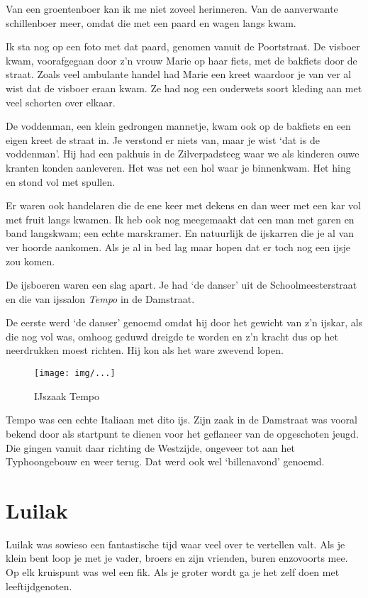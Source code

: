 \documentclass[10pt,twoside,openright]{memoir}
\begin{document}
Van een groentenboer kan ik me niet zoveel herinneren. Van de aanverwante schillenboer meer, omdat die met een paard en wagen langs kwam. 

Ik sta nog op een foto met dat paard, genomen vanuit de Poortstraat. De visboer kwam, voorafgegaan door z’n vrouw Marie op haar fiets, met de bakfiets door de straat. Zoals veel ambulante handel had Marie een kreet waardoor je van ver al wist dat de visboer eraan kwam. Ze had nog een ouderwets soort kleding aan met veel schorten over elkaar.

De voddenman, een klein gedrongen mannetje, kwam ook op de bakfiets en een eigen kreet de straat in. Je verstond er niets van, maar je wist `dat is de voddenman’. Hij had een pakhuis in de Zilverpadsteeg waar we als kinderen ouwe kranten konden aanleveren. Het was net een hol waar je binnenkwam. Het hing en stond vol met spullen. 

Er waren ook handelaren die de ene keer met dekens en dan weer met een kar vol met fruit langs kwamen. Ik heb ook nog meegemaakt dat een man met garen en band langskwam; een echte marskramer. En natuurlijk de ijskarren die je al van ver hoorde aankomen. Als je al in bed lag maar hopen dat er toch nog een ijsje zou komen.

De ijsboeren waren een slag apart. Je had `de danser’ uit de Schoolmeesterstraat en die van ijssalon \emph{Tempo} in de Damstraat. 

De eerste werd `de danser' genoemd omdat hij door het gewicht van z’n ijskar, als die nog vol was, omhoog geduwd dreigde te worden en z’n kracht dus op het neerdrukken moest richten. Hij kon als het ware zwevend lopen. 

\begin{figure}[t]
\texttt{[image: img/...]}
\caption{IJszaak Tempo}
\end{figure}

Tempo was een echte Italiaan met dito ijs. Zijn zaak in de Damstraat was vooral bekend door als startpunt te dienen voor het geflaneer van de opgeschoten jeugd.  Die gingen vanuit daar richting de Westzijde, ongeveer tot aan het Typhoongebouw en weer terug. Dat werd ook wel ‘billenavond’ genoemd. 

\chapter{Luilak} %
\label{cha:luilak}

Luilak was sowieso een fantastische tijd waar veel over te vertellen valt. Als je klein bent loop je met je vader, broers en zijn vrienden, buren enzovoorts mee. Op elk kruispunt was wel een fik. Als je groter wordt ga je het zelf doen met leeftijdgenoten. 
\end{document}

